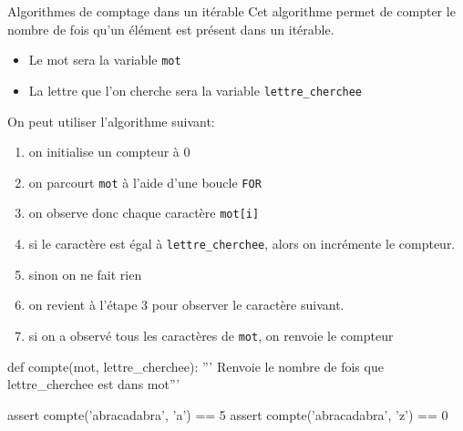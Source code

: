 	\begin{easybox}{Algorithmes de comptage dans un itérable}
Cet algorithme permet de compter le nombre de fois qu'un élément est présent dans un itérable.
			\begin{itemize}

				\item Le mot sera la variable \verb|mot|
				\item La lettre que l'on cherche sera la variable \verb|lettre_cherchee|
			\end{itemize}

			On peut utiliser l'algorithme suivant:
			
	\begin{enumerate}
		\item on initialise un compteur à 0
		\item on parcourt \verb|mot| à l'aide d'une boucle \verb|FOR|
		\item on observe donc chaque caractère \verb|mot[i]|
		\item si le caractère est égal à \verb|lettre_cherchee|, alors on incrémente le compteur.
		\item sinon on ne fait rien 
		\item on revient à l'étape 3 pour observer le caractère suivant.
		\item si on a observé tous les caractères de \verb|mot|, on renvoie le compteur
	\end{enumerate}
		

	\end{easybox}

	\begin{exercice_cours}{}	
		\begin{CodePythontexAlt}[TaillePolice=\normalsize, Largeur=1\linewidth,Centre,PremLigne=1, Lignes=false,]{}
			def compte(mot, lettre_cherchee):
				''' Renvoie le nombre de fois que lettre_cherchee est dans mot'''







			
			assert compte('abracadabra', 'a') == 5
			assert compte('abracadabra', 'z') == 0
				
			\end{CodePythontexAlt}
	\end{exercice_cours}

